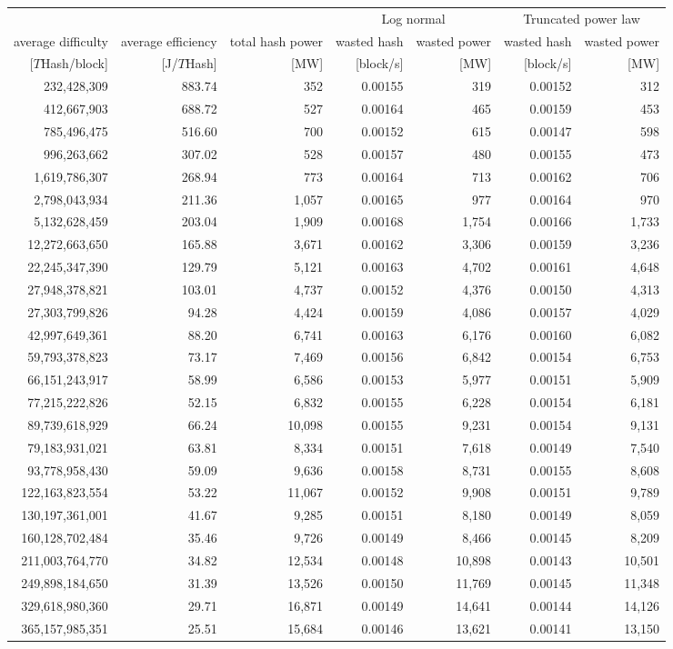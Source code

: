 \begin{tabular}{@{}rrrrrrr@{}}
\toprule
 &  &  & \multicolumn{2}{c}{Log normal} & \multicolumn{2}{c}{Truncated power law}\\
\cmidrule(lr){4-5} \cmidrule(lr){6-7} 
average difficulty & average efficiency & total hash power & wasted hash & wasted power & wasted hash & wasted power\\
$[T$Hash/block] & [J/$T$Hash] & [MW] & [block/s] & [MW] & [block/s] & [MW]\\
\cmidrule(lr){1-7}
232,428,309 & 883.74 & 352 & 0.00155 & 319 & 0.00152 & 312 \\
412,667,903 & 688.72 & 527 & 0.00164 & 465 & 0.00159 & 453 \\
785,496,475 & 516.60 & 700 & 0.00152 & 615 & 0.00147 & 598 \\
996,263,662 & 307.02 & 528 & 0.00157 & 480 & 0.00155 & 473 \\
1,619,786,307 & 268.94 & 773 & 0.00164 & 713 & 0.00162 & 706 \\
2,798,043,934 & 211.36 & 1,057 & 0.00165 & 977 & 0.00164 & 970 \\
5,132,628,459 & 203.04 & 1,909 & 0.00168 & 1,754 & 0.00166 & 1,733 \\
12,272,663,650 & 165.88 & 3,671 & 0.00162 & 3,306 & 0.00159 & 3,236 \\
22,245,347,390 & 129.79 & 5,121 & 0.00163 & 4,702 & 0.00161 & 4,648 \\
27,948,378,821 & 103.01 & 4,737 & 0.00152 & 4,376 & 0.00150 & 4,313 \\
27,303,799,826 & 94.28 & 4,424 & 0.00159 & 4,086 & 0.00157 & 4,029 \\
42,997,649,361 & 88.20 & 6,741 & 0.00163 & 6,176 & 0.00160 & 6,082 \\
59,793,378,823 & 73.17 & 7,469 & 0.00156 & 6,842 & 0.00154 & 6,753 \\
66,151,243,917 & 58.99 & 6,586 & 0.00153 & 5,977 & 0.00151 & 5,909 \\
77,215,222,826 & 52.15 & 6,832 & 0.00155 & 6,228 & 0.00154 & 6,181 \\
89,739,618,929 & 66.24 & 10,098 & 0.00155 & 9,231 & 0.00154 & 9,131 \\
79,183,931,021 & 63.81 & 8,334 & 0.00151 & 7,618 & 0.00149 & 7,540 \\
93,778,958,430 & 59.09 & 9,636 & 0.00158 & 8,731 & 0.00155 & 8,608 \\
122,163,823,554 & 53.22 & 11,067 & 0.00152 & 9,908 & 0.00151 & 9,789 \\
130,197,361,001 & 41.67 & 9,285 & 0.00151 & 8,180 & 0.00149 & 8,059 \\
160,128,702,484 & 35.46 & 9,726 & 0.00149 & 8,466 & 0.00145 & 8,209 \\
211,003,764,770 & 34.82 & 12,534 & 0.00148 & 10,898 & 0.00143 & 10,501 \\
249,898,184,650 & 31.39 & 13,526 & 0.00150 & 11,769 & 0.00145 & 11,348 \\
329,618,980,360 & 29.71 & 16,871 & 0.00149 & 14,641 & 0.00144 & 14,126 \\
365,157,985,351 & 25.51 & 15,684 & 0.00146 & 13,621 & 0.00141 & 13,150 \\
\bottomrule
\end{tabular}
